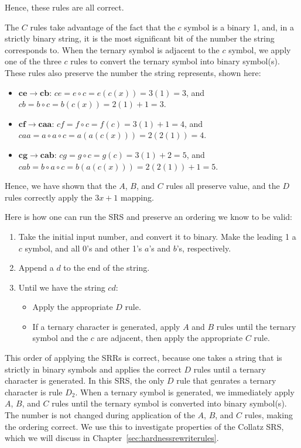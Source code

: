 Hence, these rules are all correct. \par
The $C$ rules take advantage of the fact that the $c$ symbol is a binary 1, and, in a strictly binary string, it is the most significant bit of the number the string corresponds to. When the ternary symbol is adjacent to the $c$ symbol, we apply one of the three $c$ rules to convert the ternary symbol into binary symbol(s). These rules also preserve the number the string represents, shown here:
\begin{itemize}
    \item $\boldsymbol{ce \rightarrow cb}$: $ce = e \circ c = e(c(x)) = 3(1) = 3$, and $cb = b
    \circ c = b(c(x)) = 2(1)+1 = 3$.
    \item $\boldsymbol{cf \rightarrow caa}$: $cf = f \circ c = f(c) = 3(1)+ 1 = 4$, and $caa = a \circ a \circ c = a(a(c(x))) = 2(2(1)) = 4$.
    \item $\boldsymbol{cg \rightarrow cab}$: $cg = g \circ c = g(c) = 3(1)+ 2 = 5$, and $cab = b \circ a \circ c = b(a(c(x))) = 2(2(1))+1 = 5$.
\end{itemize}
Hence, we have shown that the $A$, $B$, and $C$ rules all preserve value, and the $D$ rules correctly apply the $3x+1$ mapping. \par
Here is how one can run the SRS and preserve an ordering we know to be valid:
\begin{enumerate}
    \item Take the initial input number, and convert it to binary. Make the leading 1 a $c$ symbol, and all 0's and other 1's $a$'s and $b$'s, respectively.
    \item Append a $d$ to the end of the string.
    \item Until we have the string $cd$: 
    \begin{itemize}
        \item Apply the appropriate $D$ rule.
        \item If a ternary character is generated, apply $A$ and $B$ rules until the ternary symbol and the $c$ are adjacent, then apply the appropriate $C$ rule.
    \end{itemize}
\end{enumerate}
This order of applying the SRRs is correct, because one takes a string that is strictly in binary symbols and applies the correct $D$ rules until a ternary character is generated. In this SRS, the only $D$ rule that genrates a ternary character is rule $D_2$. When a ternary symbol is generated, we immediately apply $A$, $B$, and $C$ rules until the ternary symbol is converted into binary symbol(s). The number is not changed during application of the $A$, $B$, and $C$ rules, making the ordering correct. We use this to investigate properties of the Collatz SRS, which we will discuss in Chapter~\ref{sec:hardnessrewriterules}. \par
